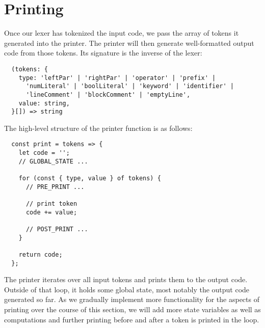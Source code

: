 \section{Printing}
Once our lexer has tokenized the input code,
we pass the array of tokens it generated into the printer.
The printer will then generate well-formatted output code from those tokens.
Its signature is the inverse of the lexer:
\begin{verbatim}
  (tokens: {
    type: 'leftPar' | 'rightPar' | 'operator' | 'prefix' |
      'numLiteral' | 'boolLiteral' | 'keyword' | 'identifier' |
      'lineComment' | 'blockComment' | 'emptyLine',
    value: string,
  }[]) => string
\end{verbatim}

The high-level structure of the printer function is as follows:
\begin{verbatim}
  const print = tokens => {
    let code = '';
    // GLOBAL_STATE ...

    for (const { type, value } of tokens) {
      // PRE_PRINT ...

      // print token
      code += value;

      // POST_PRINT ...
    }

    return code;
  };
\end{verbatim}
The printer iterates over all input tokens
and prints them to the output code.
Outside of that loop, it holds some global state,
most notably the output code generated so far.
As we gradually implement
more functionality for the aspects of printing
over the course of this section,
we will add more state variables
as well as computations and further printing
before and after a token is printed in the loop.










